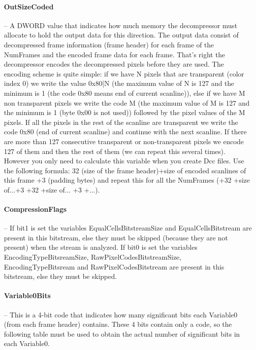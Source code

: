 \paragraph{OutSizeCoded} -- A DWORD value that indicates how much memory the 
decompressor must allocate to hold the output data for this direction. The 
output data consist of decompressed frame information (frame header) for each 
frame of the NumFrames and the encoded frame data for each frame. That's right 
the decompressor encodes the decompressed pixels before they are used. The 
encoding scheme is quite simple: if we have N pixels that are transparent 
(color index 0) we write the value 0x80|N (the maximum value of N is 127 and 
the minimum is 1 (the code 0x80 means end of current scanline)), else if we 
have M non transparent pixels we write the code M (the maximum value of M is 
127 and the minimum is 1 (byte 0x00 is not used)) followed by the pixel values 
of the M pixels. If all the pixels in the rest of the scanline are transparent 
we write the code 0x80 (end of current scanline) and continue with the next 
scanline. If there are more than 127 consecutive transparent or non-transparent 
pixels we encode 127 of them and then the rest of them (we can repeat this 
several times). However you only need to calculate this variable when you 
create Dcc files. Use the following formula: 32 (size of the frame header)+size 
of encoded scanlines of this frame +3 (padding bytes) and repeat this for all 
the NumFrames (+32 +size of...+3 +32 +size of... +3 +...).	

\paragraph{CompressionFlags} -- If bit1 is set the variables 
EqualCellsBitstreamSize and EqualCellsBitstream are present in this bitstream, 
else they must be skipped (because they are not present) when the stream is 
analyzed. If bit0 is set the variables EncodingTypeBitsreamSize, 
RawPixelCodesBitstreamSize, EncodingTypeBitsream and RawPixelCodesBitstream are 
present in this bitstream, else they must be skipped.	

\paragraph{Variable0Bits} -- This is a 4-bit code that indicates how many 
significant bits each Variable0 (from each frame header) contains. These 4 bits 
contain only a code, so the following table must be used to obtain the actual 
number of significant bits in each Variable0.

